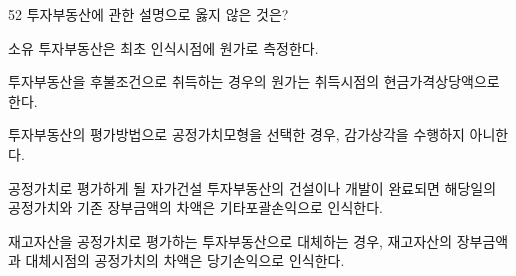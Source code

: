 \begin{question}{52}
투자부동산에 관한 설명으로 옳지 않은 것은?
\begin{choices}
  \item 소유 투자부동산은 최초 인식시점에 원가로 측정한다.
  \item 투자부동산을 후불조건으로 취득하는 경우의 원가는 취득시점의 현금가격상당액으로 한다.
  \item 투자부동산의 평가방법으로 공정가치모형을 선택한 경우, 감가상각을 수행하지 아니한다.
  \item 공정가치로 평가하게 될 자가건설 투자부동산의 건설이나 개발이 완료되면 해당일의 공정가치와 기존 장부금액의 차액은 기타포괄손익으로 인식한다.
  \item 재고자산을 공정가치로 평가하는 투자부동산으로 대체하는 경우, 재고자산의 장부금액과 대체시점의 공정가치의 차액은 당기손익으로 인식한다.
\end{choices}
\end{question}
